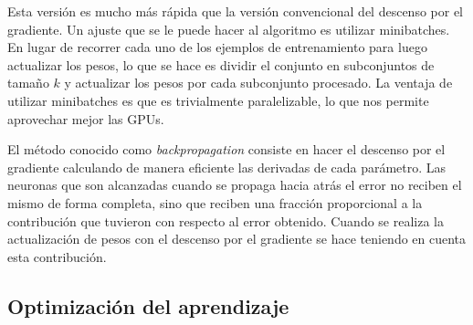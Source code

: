 \documentclass[spanish]{report}
\begin{document}
Esta versión es mucho más rápida que la versión convencional del descenso por el gradiente. Un ajuste que se le puede hacer al algoritmo es utilizar minibatches. En lugar de recorrer cada uno de los ejemplos de entrenamiento para luego actualizar los pesos, lo que se hace es dividir el conjunto en subconjuntos de tamaño $k$ y actualizar los pesos por cada subconjunto procesado. La ventaja de utilizar minibatches es que es trivialmente paralelizable, lo que nos permite aprovechar mejor las GPUs.

El método conocido como \textit{backpropagation} consiste en hacer el descenso por el gradiente calculando de manera eficiente las derivadas de cada parámetro. Las neuronas que son alcanzadas cuando se propaga hacia atrás el error no reciben el mismo de forma completa, sino que reciben una fracción proporcional a la contribución que tuvieron con respecto al error obtenido. Cuando se realiza la actualización de pesos con el descenso por el gradiente se hace teniendo en cuenta esta contribución.





\subsection{Optimización del aprendizaje}
\end{document}
